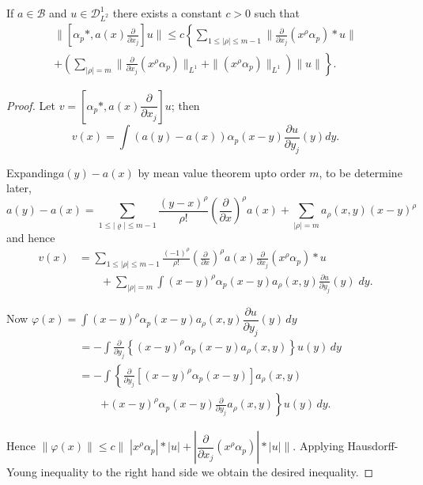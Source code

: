 \begin{lemma}\label{chap3-sec9-lem2} %
If $a \in \mathscr{B}$ and $u \in \mathscr{D}^1_{L^2}$ there exists a
constant $c > 0$ such that  
\begin{gather*}
\| \left[ \alpha_p *, a(x) \frac{\partial}{\partial x_j} \right] u \|  \le c
\left\{ \sum_{1 \le  | \rho | \le m-1} \|  \frac{\partial}{\partial
  x_j} (x^{\rho} \alpha_p) * u \| \right.\\
\left.  +  \left( \sum_{| \rho | = m} \|
\frac{\partial}{\partial x_j}(x^\rho \alpha_p) \|_{L^1} +  \| (x^\rho
\alpha_p) \| _{L^1}\right) \| u \| \right\}. \tag{9.15}\label{chap3-eq9.15} 
\end{gather*}
 \end{lemma}

\begin{proof}
Let $v =  \left[ \alpha_p *, a(x) \dfrac{\partial}{\partial
    x_j}\right] u$; then  
$$
v(x) = \int (a(y) - a(x)) \alpha_p (x-y) \frac{\partial u}{\partial
  y_j} (y) dy. 
$$
 
Expanding\pageoriginale $a(y)- a(x)$ by mean value theorem upto order
$m$, to be determine later,  
 $$
 a(y) - a(x) = \sum\limits_{1 \le | \varrho | \le m-1} \frac{(y -
   x)^\rho}{\rho !} ( \frac{\partial}{\partial x})^\rho a(x) + \sum_{|
   \rho | =m} a_\rho (x,y) (x-y)^\rho 
 $$
 and hence 
 \begin{align*}
 v(x) & = \sum\limits_{1 \le | \rho | \le m-1} \frac{(-1)^\rho}{\rho
   !} (\frac{\partial}{\partial x})^\rho a(x) \frac{\partial}{\partial
   x_j}(x^\rho \alpha_p) * u\\
& \qquad  +  \sum\limits_{|\rho| = m}\int (x-y)^\rho
 \alpha_p (x-y) a_\rho (x,y) \frac{\partial u}{\partial y_j}(y) \; dy.  
 \end{align*}

  Now \quad $\varphi (x) = \int (x-y)^\rho \alpha_p (x-y) a_\rho (x,y)
  \dfrac{\partial u}{\partial y_j} (y) \, dy$ 
 \begin{align*}
& = - \int \frac{\partial}{\partial y_j} \left\{ (x-y)^\rho \alpha_p
   (x-y) a_\rho (x,y) \right\} u(y) \, dy \\ 
& = - \int \left\{ \frac{\partial}{\partial y_j} \left[ (x-y)^\rho
     \alpha_p (x-y) \right] a_\rho (x,y)  \right.\\
& \qquad  \left. +(x-y)^\rho \alpha_p (x-y)
   \frac{\partial}{\partial y_j} a_\rho (x,y) \right\} u(y) \, dy. 
 \end{align*} 

 Hence $\|\varphi (x) \| \le c \| \; |x^\rho \alpha_p | *|u| +  |
 \dfrac{\partial}{\partial x_j} (x^\rho \alpha_p) | *| u |
 \|$. Applying Haus\-dorff-Young inequality to the right hand side we
 obtain the desired inequality. 
 

\end{proof}
